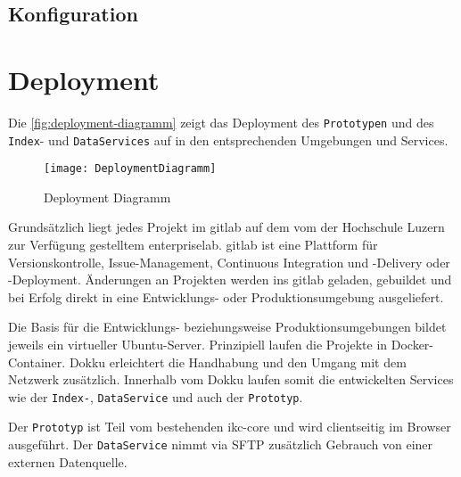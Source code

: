     
\subsection{Konfiguration}




\section{Deployment}



Die \autoref{fig:deployment-diagramm} zeigt das Deployment des \texttt{Prototypen} und des \texttt{Index}- und \texttt{DataServices} auf in den entsprechenden Umgebungen und Services.

    \begin{figure}[H]
    \centering
    \texttt{[image: DeploymentDiagramm]}
    \caption{Deployment Diagramm}
    \label{fig:deployment-diagramm}
    \end{figure}

Grundsätzlich liegt jedes Projekt im \gls{gitlab} auf dem vom der Hochschule Luzern zur Verfügung gestelltem \gls{enterpriselab}. \gls{gitlab} ist eine Plattform für Versionskontrolle, Issue-Management, Continuous Integration und -Delivery oder -Deployment. Änderungen an Projekten werden ins \gls{gitlab} geladen, gebuildet und bei Erfolg direkt in eine Entwicklungs- oder Produktionsumgebung ausgeliefert.

Die Basis für die Entwicklungs- beziehungsweise Produktionsumgebungen bildet jeweils ein virtueller \gls{Ubuntu}-Server.
Prinzipiell laufen die Projekte in \gls{Docker}-Container. \gls{Dokku} erleichtert die Handhabung und den Umgang mit dem Netzwerk zusätzlich. Innerhalb vom \gls{Dokku} laufen somit die entwickelten Services wie der \texttt{Index-}, \texttt{DataService} und auch der \texttt{Prototyp}. 

Der \texttt{Prototyp} ist Teil vom bestehenden \gls{ikc-core} und wird clientseitig im Browser ausgeführt. Der \texttt{DataService} nimmt via \gls{SFTP} zusätzlich Gebrauch von einer externen Datenquelle.


    
